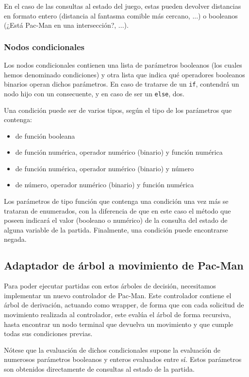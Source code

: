 En el caso de las consultas al estado del juego, estas pueden devolver distancias en formato entero (distancia al fantasma comible más cercano, ...) o booleanos (¿Está Pac-Man en una intersección?, ...).

\subsubsection{Nodos condicionales}
Los nodos condicionales contienen una lista de parámetros booleanos (los cuales hemos denominado condiciones) y otra lista que indica qué operadores booleanos binarios operan dichos parámetros. En caso de tratarse de un \texttt{if}, contendrá un nodo hijo con un consecuente, y en caso de ser un \texttt{else}, dos.
 
Una condición puede ser de varios tipos, según el tipo de los parámetros que contenga:
\begin{itemize}
\item de función booleana
\item de función numérica, operador numérico (binario) y función numérica
\item de función numérica, operador numérico (binario) y número
\item de número, operador numérico (binario) y función numérica
\end{itemize}

Los parámetros de tipo función que contenga una condición una vez más se trataran de enumerados, con la diferencia de que en este caso el método que poseen indicará el valor (booleano o numérico) de la consulta del estado de alguna variable de la partida. Finalmente, una condición puede encontrarse negada.

\subsection{Adaptador de árbol a movimiento de Pac-Man}
Para poder ejecutar partidas con estos árboles de decisión, necesitamos implementar un nuevo controlador de Pac-Man. Este controlador contiene el árbol de derivación, actuando como wrapper, de forma que con cada solicitud de movimiento realizada al controlador, este evalúa el árbol de forma recursiva, hasta encontrar un nodo terminal que devuelva un movimiento y que cumple todas sus condiciones previas.

Nótese  que la evaluación de dichos condicionales supone la evaluación de numerosos parámetros booleanos y enteros evaluados entre sí. Estos parámetros son obtenidos directamente de consultas al estado de la partida.

